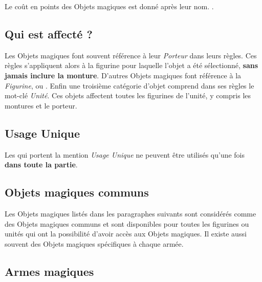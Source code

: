 Le coût en points des Objets magiques est donné après leur nom. .

\subsection{Qui est affecté ?}

Les Objets magiques font souvent référence à leur \emph{Porteur} dans leurs règles. Ces règles s'appliquent alors à la figurine pour laquelle l'objet a été sélectionné, \textbf{sans jamais inclure la monture}. D'autres Objets magiques font référence à la \emph{Figurine}, ou . Enfin une troisième catégorie d'objet comprend dans ses règles le mot-clé \emph{Unité}. Ces objets affectent toutes les figurines de l'unité, y compris les montures et le porteur.

\subsection{Usage Unique}

Les  qui portent la mention \emph{Usage Unique} ne peuvent être utilisés qu'une fois \textbf{dans toute la partie}.


\subsection{Objets magiques communs}

Les Objets magiques listés dans les paragraphes suivants sont considérés comme des Objets magiques communs et sont disponibles pour toutes les figurines ou unités qui ont la possibilité d'avoir accès aux Objets magiques. Il existe aussi souvent des Objets magiques spécifiques à chaque armée.

\newpage

\subsection{Armes magiques}

